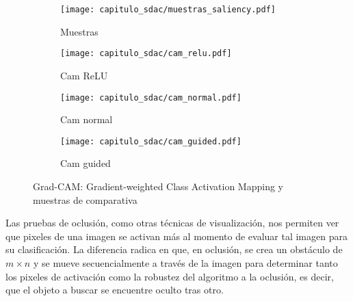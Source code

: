   \begin{figure}[H] 
      \begin{subfigure}[b]{0.5\linewidth}
        \centering
        \texttt{[image: capitulo\_sdac/muestras\_saliency.pdf]} 
        \caption{Muestras}\label{fig7:ab}
        \vspace{4ex}
      \end{subfigure}%
      \begin{subfigure}[b]{0.5\linewidth}
        \centering
        \texttt{[image: capitulo\_sdac/cam\_relu.pdf]} 
        \caption{Cam ReLU}\label{fig7:ba}
        \vspace{4ex}
      \end{subfigure} 
      \begin{subfigure}[b]{0.5\linewidth}
        \centering
        \texttt{[image: capitulo\_sdac/cam\_normal.pdf]} 
        \caption{Cam normal}\label{fig7:cd}
      \end{subfigure}%
      \begin{subfigure}[b]{0.5\linewidth}
        \centering
        \texttt{[image: capitulo\_sdac/cam\_guided.pdf]} 
        \caption{Cam guided}\label{fig7:dc}
      \end{subfigure} 
      \caption{Grad-CAM: Gradient-weighted Class Activation Mapping y muestras de comparativa}\label{fig:cam} 
    \end{figure}

Las pruebas de oclusión, como otras técnicas de visualización, nos permiten ver que pixeles de
una imagen se activan más al momento de evaluar tal imagen para su clasificación. La diferencia
radica en que, en oclusión, se crea un obstáculo de \(m \times n\) y se mueve secuencialmente
a través de la imagen para determinar tanto los pixeles de activación como la robustez del
algoritmo a la oclusión, es decir, que el objeto a buscar se encuentre oculto tras otro. 

